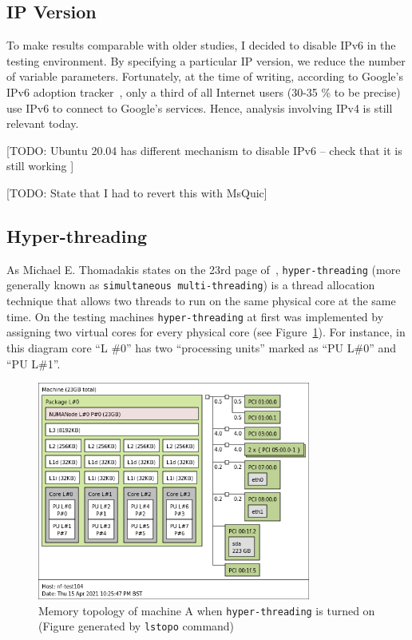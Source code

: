 \documentclass[12pt,a4paper,twoside,openright]{report}
\begin{document}
\subsection{IP Version}

To make results comparable with older studies, I decided to disable IPv6 in the testing environment.
By specifying a particular IP version, we reduce the number of variable parameters.
Fortunately, at the time of writing, according to Google's IPv6 adoption tracker~\cite{IPv6_Adoption_Statistics}, only a third of all Internet users (30-35 \% to be precise) use IPv6 to connect to Google's services.
Hence, analysis involving IPv4 is still relevant today.

[TODO: Ubuntu 20.04 has different mechanism  to disable IPv6 -- check that it is still working ]

[TODO: State that I had to revert this with MsQuic]

\subsection{Hyper-threading}\label{Hyperthreading_Subsection_Tag}

As Michael E. Thomadakis states on the 23rd page of~\cite{hyperthreading_book}, \texttt{hyper-threading} (more generally known as \texttt{simultaneous multi-threading}) is a thread allocation technique that allows two threads to run on the same physical core at the same time.
On the testing machines \texttt{hyper-threading} at first was implemented by assigning two virtual cores for every physical core (see Figure~\ref{fig:topology_with_hyperthreading}).
For instance, in this diagram core \enquote{L \#0} has two \enquote{processing units} marked as \enquote{PU L\#0} and \enquote{PU L\#1}.

    \begin{figure}[H]
    \centering
    \includegraphics[width=0.8\textwidth]{figs/topology_with_hyperthreading.png}
    \caption[Memory topology of machine A when \texttt{hyper-threading} is turned on]{Memory topology of machine A when \texttt{hyper-threading} is turned on (Figure generated by \texttt{lstopo} command)}
    \label{fig:topology_with_hyperthreading}
    \end{figure}
\end{document}
